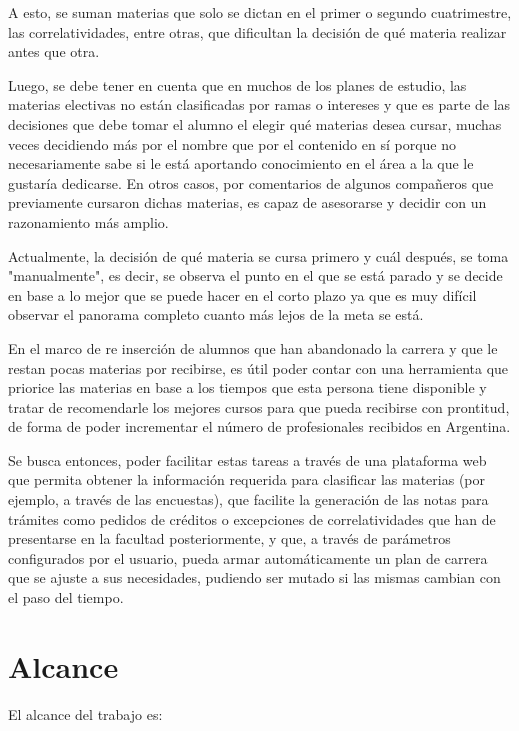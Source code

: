 \documentclass[a4paper]{article}
\begin{document}
A esto, se suman materias que solo se dictan en el primer o segundo cuatrimestre, las correlatividades, entre otras, que dificultan la decisión de qué materia realizar antes que otra.

Luego, se debe tener en cuenta que en muchos de los planes de estudio, las materias electivas no están clasificadas por ramas o intereses y que es parte de las decisiones que debe tomar el alumno el elegir qué materias desea cursar, muchas veces decidiendo más por el nombre que por el contenido en sí porque no necesariamente sabe si le está aportando conocimiento en el área a la que le gustaría dedicarse. En otros casos, por comentarios de algunos compañeros que previamente cursaron dichas materias, es capaz de asesorarse y decidir con un razonamiento más amplio.

Actualmente, la decisión de qué materia se cursa primero y cuál después, se toma "manualmente", es decir, se observa el punto en el que se está parado y se decide en base a lo mejor que se puede hacer en el corto plazo ya que es muy difícil observar el panorama completo cuanto más lejos de la meta se está.

En el marco de re inserción de alumnos que han abandonado la carrera y que le restan pocas materias por recibirse, es útil poder contar con una herramienta que priorice las materias en base a los tiempos que esta persona tiene disponible y tratar de recomendarle los mejores cursos para que pueda recibirse con prontitud, de forma de poder incrementar el número de profesionales recibidos en Argentina.

Se busca entonces, poder facilitar estas tareas a través de una plataforma web que permita obtener la información requerida para clasificar las materias (por ejemplo, a través de las encuestas), que facilite la generación de las notas para trámites como pedidos de créditos o excepciones de correlatividades que han de presentarse en la facultad posteriormente, y que, a través de parámetros configurados por el usuario, pueda armar automáticamente un plan de carrera que se ajuste a sus necesidades, pudiendo ser mutado si las mismas cambian con el paso del tiempo.

\section{Alcance}

El alcance del trabajo es:
\end{document}
